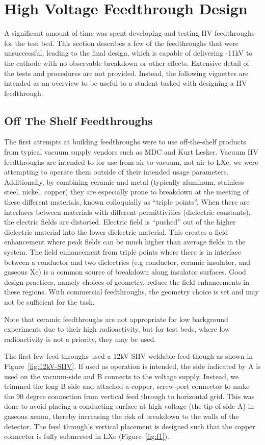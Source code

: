 \section{High Voltage Feedthrough Design}
A significant amount of time was spent developing and testing \ac{HV} feedthroughs for the test bed. This section describes a few of the feedthroughs that were unsuccessful, leading to the final design, which is capable of delivering -11kV to the cathode with no observable breakdown or other effects. Extensive detail of the tests and procedures are not provided. Instead, the following vignettes are intended as an overview to be useful to a student tasked with designing a HV feedthrough. 

\subsection{Off The Shelf Feedthroughs}
The first attempts at building feedthroughs were to use off-the-shelf products from typical vacuum supply vendors such as MDC and Kurt Lesker. Vacuum \ac{HV} feedthroughs are intended to for use from air to vacuum, not air to \ac{LXe}; we were attempting to operate them outside of their intended usage parameters. Additionally, by combining ceramic and metal (typically aluminum, stainless steel, nickel, copper) they are especially prone to breakdown at the meeting of these different materials, known colloquially as ``triple points''. When there are interfaces between materials with different permittivities (dielectric constants), the electric fields are distorted. Electric field is ``pushed'' out of the higher dielectric material into the lower dielectric material. This creates a field enhancement where peak fields can be much higher than average fields in the system. The field enhancement from triple points where there is in interface between a conductor and two dielectrics (e.g conductor, ceramic insulator, and gaseous Xe) is a common source of breakdown along insulator surfaces. Good design practices, namely choices of geometry, reduce the field enhancements in these regions. With commercial feedthroughs, the geometry choice is set and may not be sufficient for the task.

Note that ceramic feedthroughs are not appropriate for low background experiments due to their high radioactivity, but for test beds, where low radioactivity is not a priority, they may be used.

The first few feed throughs used a 12kV \ac{SHV} weldable feed though as shown in Figure~\ref{fig:12kV-SHV}. If used as operation is intended, the side indicated by A is used on the vacuum-side and B connects to the voltage supply. Instead, we trimmed the long B side and attached a copper, screw-port connector to make the 90 degree connection from vertical feed through to horizontal grid. This was done to avoid placing a conducting surface at high voltage (the tip of side A) in gaseous xenon, thereby increasing the risk of breakdown to the walls of the detector. The feed through's vertical placement is designed such that the copper connector is fully submersed in \ac{LXe} (Figure~\ref{fig:f1}).

